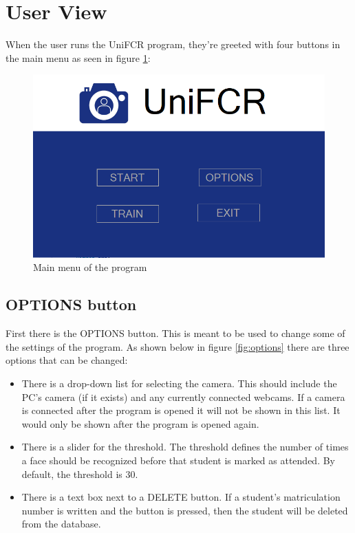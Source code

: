 \documentclass[12pt, a4paper]{article}
\begin{document}
\newpage



\section{User View}
When the user runs the UniFCR program, they're greeted with four buttons in the main menu as seen in figure \ref{fig:menu}:
\begin{figure}[h!]
	\centering
		\includegraphics[width=1.0\columnwidth]{images/menu}
	\caption{Main menu of the program}
	\label{fig:menu}
\end{figure}
\subsection{OPTIONS button}
First there is the OPTIONS button. This is meant to be used to change some of the settings of the program. As shown below in figure \ref{fig:options} there are three options that can be changed:
\begin{itemize}
\item There is a drop-down list for selecting the camera. This should include the PC’s camera (if it exists) and any currently connected webcams. If a camera is connected after the program is opened it will not be shown in this list. It would only be shown after the program is opened again. 
\item There is a slider for the threshold. The threshold defines the number of times a face should be recognized before that student is marked as attended. By default, the threshold is 30.
\item There is a text box next to a DELETE button. If a student’s matriculation number is written and the button is pressed, then the student will be deleted from the database.
\end{itemize}
\end{document}
